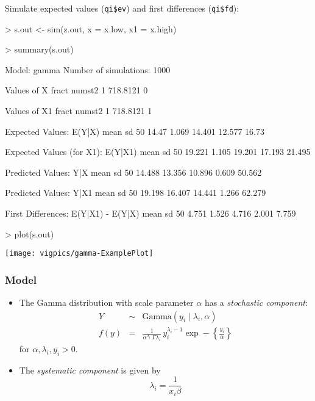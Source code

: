 Simulate expected values ({\tt qi\$ev}) and first differences ({\tt qi\$fd}):
\begin{Schunk}
\begin{Sinput}
> s.out <- sim(z.out, x = x.low, x1 = x.high)
\end{Sinput}
\end{Schunk}
\begin{Schunk}
\begin{Sinput}
> summary(s.out)
\end{Sinput}
\begin{Soutput}
Model:  gamma 
Number of simulations:  1000 

Values of X
     fract numst2
1 718.8121      0

Values of X1
     fract numst2
1 718.8121      1


Expected Values: E(Y|X) 
  mean    sd    50%   2.5% 97.5%
 14.47 1.069 14.401 12.577 16.73

Expected Values (for X1): E(Y|X1) 
   mean    sd    50%   2.5%  97.5%
 19.221 1.105 19.201 17.193 21.495

Predicted Values: Y|X 
   mean     sd    50%  2.5%  97.5%
 14.488 13.356 10.896 0.609 50.562

Predicted Values: Y|X1 
   mean     sd    50%  2.5%  97.5%
 19.198 16.407 14.441 1.266 62.279

First Differences: E(Y|X1) - E(Y|X) 
  mean    sd   50%  2.5% 97.5%
 4.751 1.526 4.716 2.001 7.759
\end{Soutput}
\end{Schunk}
\begin{center}
\begin{Schunk}
\begin{Sinput}
> plot(s.out)
\end{Sinput}
\end{Schunk}
\texttt{[image: vigpics/gamma-ExamplePlot]}
\end{center}

\subsubsection{Model}

\begin{itemize}
\item The Gamma distribution with scale parameter $\alpha$ has a
\emph{stochastic component}:
\begin{eqnarray*}
Y &\sim& \textrm{Gamma}(y_i \mid \lambda_i, \alpha) \\
f(y)  &=& \frac{1}{\alpha^{\lambda_i} \, \Gamma \lambda_i} \, y_i^{\lambda_i
  - 1} \exp -\left\{ \frac{y_i}{\alpha} \right\}
\end{eqnarray*}
for $\alpha, \lambda_i, y_i > 0$.  \\

\item The \emph{systematic component} is given by
\begin{equation*}
  \lambda_i = \frac{1}{x_i \beta}
\end{equation*}
\end{itemize}

